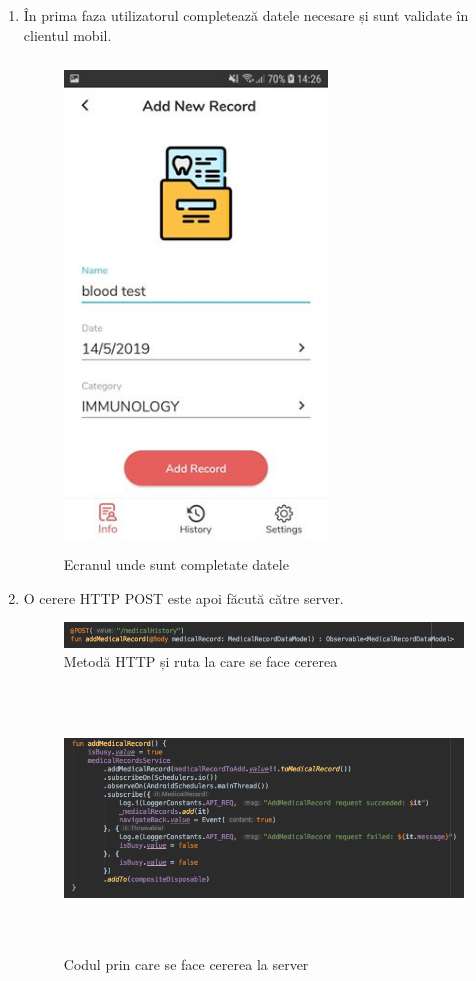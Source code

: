 \documentclass[12pt]{article}
\begin{document}
\begin{enumerate}
    \item În prima faza utilizatorul completează datele necesare și sunt validate
    în clientul mobil.

    \begin{figure}[H]
        \centering
        \includegraphics[width=7cm, height=13cm]{addNewRecord.jpg}
        \caption{Ecranul unde sunt completate datele}
        \end{figure}

    
    \item O cerere HTTP POST este apoi făcută către server.
    
    \begin{figure}[H]
        \centering
        \includegraphics[width=15cm]{addMethod.png}
        \caption{Metodă HTTP și ruta la care se face cererea}
        \end{figure}

        \begin{figure}[H]
            \centering
            \includegraphics[width=15cm, height=7cm]{addRequest.png}
            \caption{Codul prin care se face cererea la server}
            \end{figure}



\end{enumerate}
\end{document}
